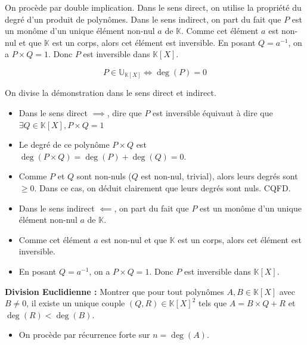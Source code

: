 \documentclass[11pt, a4paper]{article}
\theoremstyle{definition}
\begin{document}
\begin{tcolorbox}[methodstyle]
  On procède par double implication. Dans le sens direct, on utilise la propriété du degré d'un produit de polynômes. Dans le sens indirect, on part du fait que $P$ est un monôme d'un unique élément non-nul $a$ de $\mathbb K$. Comme cet élément $a$ est non-nul et que $\mathbb K$ est un corps, alors cet élément est inversible. En posant $Q = a^{-1}$, on a $P \times Q =1$. Donc $P$ est inversible dans $\mathbb K[X]$.
\end{tcolorbox}

\[
P \in \mathbb{U}_{\mathbb{K}[X]} \iff \deg(P) = 0
\]

On divise la démonstration dans le sens direct et indirect.

\begin{itemize}
\item Dans le sens direct $\implies$, dire que $P$ est inversible équivaut à dire que $\exists Q \in \mathbb{K}[X] , P\times Q = 1$
\item Le degré de ce polynôme $P\times Q$ est $\deg(P\times Q) = \deg(P) + \deg(Q) = 0$.
\item Comme $P$ et $Q$ sont non-nuls ($Q$ est non-nul, trivial), alors leurs degrés sont $\ge 0$. Dans ce cas, on déduit clairement que leurs degrés sont nuls. CQFD.
\item Dans le sens indirect $\impliedby$, on part du fait que $P$ est un monôme d'un unique élément non-nul $a$ de $\mathbb K$.
\item Comme cet élément $a$ est non-nul et que $\mathbb K$ est un corps, alors cet élément est inversible.
\item En posant $Q = a^{-1}$, on a $P \times Q =1$. Donc $P$ est inversible dans $\mathbb K[X]$.
\end{itemize}

\clearpage

\begin{tcolorbox}[instructionstyle]

\textbf{Division Euclidienne :} Montrer que pour tout polynômes $A,B \in \mathbb K[X]$ avec $B \ne 0$, il existe un unique couple $(Q,R) \in \mathbb K[X]^2$ tels que $A = B\times Q + R$ et $\deg(R) < \deg(B)$.
\end{tcolorbox}

\begin{itemize}
\item On procède par récurrence forte sur $n = \deg(A)$.
\end{itemize}
\end{document}

